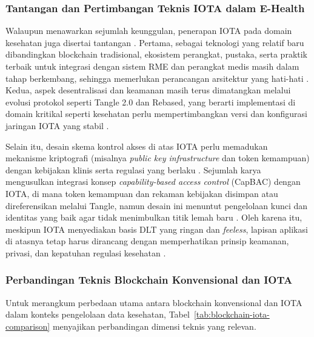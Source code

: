 \subsubsection{Tantangan dan Pertimbangan Teknis IOTA dalam E-Health}

Walaupun menawarkan sejumlah keunggulan, penerapan IOTA pada domain kesehatan juga disertai tantangan \parencite{Elevating_2025_iota_ehealth}. 
Pertama, sebagai teknologi yang relatif baru dibandingkan blockchain tradisional, ekosistem perangkat, pustaka, serta praktik terbaik untuk integrasi dengan sistem RME dan perangkat medis masih dalam tahap berkembang, sehingga memerlukan perancangan arsitektur yang hati-hati \parencite{Elevating_2025_iota_ehealth}. 
Kedua, aspek desentralisasi dan keamanan masih terus dimatangkan melalui evolusi protokol seperti Tangle 2.0 dan Rebased, yang berarti implementasi di domain kritikal seperti kesehatan perlu mempertimbangkan versi dan konfigurasi jaringan IOTA yang stabil \parencite{FromTangleToRebased_2024}. 

Selain itu, desain skema kontrol akses di atas IOTA perlu memadukan mekanisme kriptografi (misalnya \emph{public key infrastructure} dan token kemampuan) dengan kebijakan klinis serta regulasi yang berlaku \parencite{Elevating_2025_iota_ehealth,IOTA_AccessControl_2022}. 
Sejumlah karya mengusulkan integrasi konsep \emph{capability-based access control} (CapBAC) dengan IOTA, di mana token kemampuan dan rekaman kebijakan disimpan atau direferensikan melalui Tangle, namun desain ini menuntut pengelolaan kunci dan identitas yang baik agar tidak menimbulkan titik lemah baru \parencite{IOTA_AccessControl_2022}. 
Oleh karena itu, meskipun IOTA menyediakan basis DLT yang ringan dan \emph{feeless}, lapisan aplikasi di atasnya tetap harus dirancang dengan memperhatikan prinsip keamanan, privasi, dan kepatuhan regulasi kesehatan \parencite{Elevating_2025_iota_ehealth}. 

\subsubsection{Perbandingan Teknis Blockchain Konvensional dan IOTA}

Untuk merangkum perbedaan utama antara blockchain konvensional dan IOTA dalam konteks pengelolaan data kesehatan, Tabel~\ref{tab:blockchain-iota-comparison} menyajikan perbandingan dimensi teknis yang relevan.

